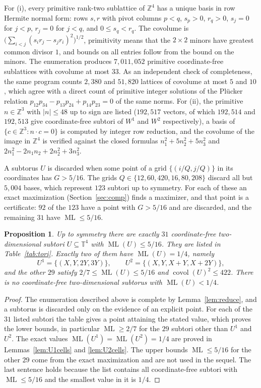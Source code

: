 \documentclass[12pt]{amsart}
\newtheorem{proposition}[theorem]{Proposition}
\theoremstyle{definition}\newtheorem{definition}[theorem]{Definition}
\theoremstyle{remark}\newtheorem{remark}[theorem]{Remark}
\newcommand{\Z}{\mathbb Z}\newcommand{\R}{\mathbb R}\newcommand{\T}{\mathbb T}
\newcommand{\ML}{\operatorname{ML}}
\newcommand{\covol}{\operatorname{covol}}
\newcommand{\eucl}[1]{\lvert #1\rvert}
\newcommand{\Uone}{U^{1}}\newcommand{\Utwo}{U^{2}}
\newcommand{\Wone}{W^{1}}\newcommand{\Wtwo}{W^{2}}
\begin{document}
For (i), every primitive rank-two sublattice of $\Z^4$ has a unique basis in row Hermite normal form: rows $s,r$ with pivot columns $p<q$, $s_p>0$, $r_q>0$, $s_j=0$ for $j<p$, $r_j=0$ for $j<q$, and $0\le s_q<r_q$. The covolume is $\bigl(\sum_{i<j}(s_ir_j-s_jr_i)^2\bigr)^{1/2}$, primitivity means that the $2\times2$ minors have greatest common divisor $1$, and bounds on all entries follow from the bound on the minors. The enumeration produces $7{,}011{,}052$ primitive coordinate-free sublattices with covolume at most $33$. As an independent check of completeness, the same program counts $2{,}380$ and $51{,}820$ lattices of covolume at most $5$ and $10$, which agree with a direct count of primitive integer solutions of the Pl\"ucker relation $p_{12}p_{34}-p_{13}p_{24}+p_{14}p_{23}=0$ of the same norms. For (ii), the primitive $n\in\Z^3$ with $\eucl n\le 48$ up to sign are listed ($192{,}517$ vectors, of which $192{,}514$ and $192{,}513$ give coordinate-free subtori of $\Wone$ and $\Wtwo$ respectively), a basis of $\{c\in\Z^3:n\cdot c=0\}$ is computed by integer row reduction, and the covolume of the image in $\Z^4$ is verified against the closed formulas $n_1^2+5n_2^2+5n_3^2$ and $2n_1^2-2n_1n_2+2n_2^2+3n_3^2$.

A subtorus $U$ is discarded when some point of a grid $\{(i/Q,j/Q)\}$ in its coordinates has $G>5/16$. The grids $Q\in\{12,60,420,16,80,208\}$ discard all but $5{,}004$ bases, which represent $123$ subtori up to symmetry. For each of these an exact maximization (Section~\ref{sec:comp}) finds a maximizer, and that point is a certificate: $92$ of the $123$ have a point with $G>5/16$ and are discarded, and the remaining $31$ have $\ML\le 5/16$.

\begin{proposition}\label{prop:list}
Up to symmetry there are exactly $31$ coordinate-free two-dimensional subtori $U\subseteq\T^4$ with $\ML(U)\le 5/16$. They are listed in Table~\ref{tab:tori}. Exactly two of them have $\ML(U)=1/4$, namely
\[
 \Uone=\{(X,Y,2Y,3Y)\},\qquad \Utwo=\{(X,Y,X+Y,X+2Y)\},
\]
and the other $29$ satisfy $2/7\le\ML(U)\le 5/16$ and $\covol(U)^2\le 422$. There is no coordinate-free two-dimensional subtorus with $\ML(U)<1/4$.
\end{proposition}
\begin{proof}
The enumeration described above is complete by Lemma~\ref{lem:reduce}, and a subtorus is discarded only on the evidence of an explicit point. For each of the $31$ listed subtori the table gives a point attaining the stated value, which proves the lower bounds, in particular $\ML\ge 2/7$ for the $29$ subtori other than $\Uone$ and $\Utwo$. The exact values $\ML(\Uone)=\ML(\Utwo)=1/4$ are proved in Lemmas~\ref{lem:U1cells} and \ref{lem:U2cells}. The upper bounds $\ML\le 5/16$ for the other $29$ come from the exact maximization and are not used in the sequel. The last sentence holds because the list contains all coordinate-free subtori with $\ML\le 5/16$ and the smallest value in it is $1/4$.
\end{proof}
\end{document}
